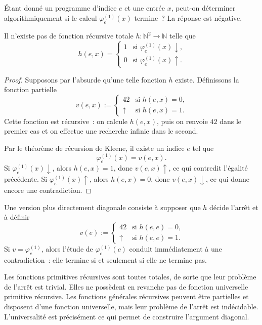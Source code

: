 \thingy Étant donné un programme d'indice $e$ et une entrée $x$, peut-on
déterminer algorithmiquement si le calcul
$\varphi_e^{(1)}(x)$ termine ?  La réponse est négative.

\begin{thm}[Turing]\label{undecidability-halting-problem}
Il n'existe pas de fonction récursive totale
$h\colon\mathbb{N}^2\to\mathbb{N}$ telle que
\[
h(e,x)=
\begin{cases}
1&\text{si $\varphi_e^{(1)}(x)\downarrow$,}\\
0&\text{si $\varphi_e^{(1)}(x)\uparrow$.}
\end{cases}
\]
\end{thm}

\begin{proof}
Supposons par l'absurde qu'une telle fonction $h$ existe.  Définissons
la fonction partielle
\[
v(e,x):=
\begin{cases}
42&\text{si $h(e,x)=0$,}\\
\uparrow&\text{si $h(e,x)=1$.}
\end{cases}
\]
Cette fonction est récursive : on calcule $h(e,x)$, puis on renvoie
$42$ dans le premier cas et on effectue une recherche infinie dans le
second.

Par le théorème de récursion de Kleene, il existe un indice $e$ tel que
\[
\varphi_e^{(1)}(x)=v(e,x).
\]
Si $\varphi_e^{(1)}(x)\downarrow$, alors $h(e,x)=1$, donc
$v(e,x)\uparrow$, ce qui contredit l'égalité précédente.  Si
$\varphi_e^{(1)}(x)\uparrow$, alors $h(e,x)=0$, donc
$v(e,x)\downarrow$, ce qui donne encore une contradiction.
\end{proof}

Une version plus directement diagonale consiste à supposer que $h$
décide l'arrêt et à définir
\[
v(e):=
\begin{cases}
42&\text{si $h(e,e)=0$,}\\
\uparrow&\text{si $h(e,e)=1$.}
\end{cases}
\]
Si $v=\varphi_c^{(1)}$, alors l'étude de $\varphi_c^{(1)}(c)$ conduit
immédiatement à une contradiction : elle termine si et seulement si
elle ne termine pas.

\thingy Les fonctions primitives récursives sont toutes totales, de
sorte que leur problème de l'arrêt est trivial.  Elles ne possèdent en
revanche pas de fonction universelle primitive récursive.  Les
fonctions générales récursives peuvent être partielles et disposent
d'une fonction universelle, mais leur problème de l'arrêt est
indécidable.  L'universalité est précisément ce qui permet de
construire l'argument diagonal.

